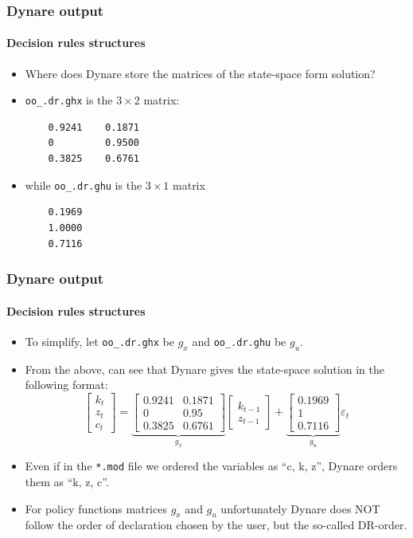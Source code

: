 \documentclass{beamer}
\begin{document}
\begin{frame}[fragile]
\frametitle{Dynare output}
\framesubtitle{Decision rules structures}
\begin{itemize}
	\item Where does Dynare store the matrices of the state-space form solution?
	\item \texttt{oo\_.dr.ghx} is the $ 3\times2 $ matrix:
	\begin{verbatim}
	0.9241    0.1871
	0         0.9500
	0.3825    0.6761
	\end{verbatim}
	\item while \texttt{oo\_.dr.ghu} is the $ 3\times1 $ matrix
	\begin{verbatim}
	0.1969
	1.0000
	0.7116
	\end{verbatim}
\end{itemize}

\end{frame}

\begin{frame}[fragile]
\frametitle{Dynare output}
\framesubtitle{Decision rules structures}
\begin{itemize}
	\item To simplify, let \texttt{oo\_.dr.ghx} be $ g_{x} $ and \texttt{oo\_.dr.ghu} be $ g_{u} $.
	\item From the above, can see that Dynare gives the state-space solution in the following format:
	\begin{equation*}
	\begin{bmatrix}
	k_{t} \\ 
	z_{t} \\ 
	c_{t}
	\end{bmatrix} =\underbrace{\begin{bmatrix}
		0.9241 & 0.1871  \\ 
		0 & 0.95  \\ 
		0.3825 & 0.6761   
		\end{bmatrix} }_{g_{x}}
	\begin{bmatrix}
	k_{t-1}\\ 
	z_{t-1}
	\end{bmatrix} + \underbrace{\begin{bmatrix}
		0.1969\\ 
		1\\ 
		0.7116
		\end{bmatrix}}_{g_{u}} \varepsilon_{t}  
	\end{equation*}
	\item Even if in the \texttt{*.mod} file we ordered the variables as ``c, k, z'', Dynare orders them as ``k, z, c''.
	\item For policy functions matrices $ g_{x} $ and $ g_{u} $ unfortunately Dynare does NOT follow the order of declaration chosen by the user, but the so-called DR-order.
\end{itemize}

\end{frame}
\end{document}
